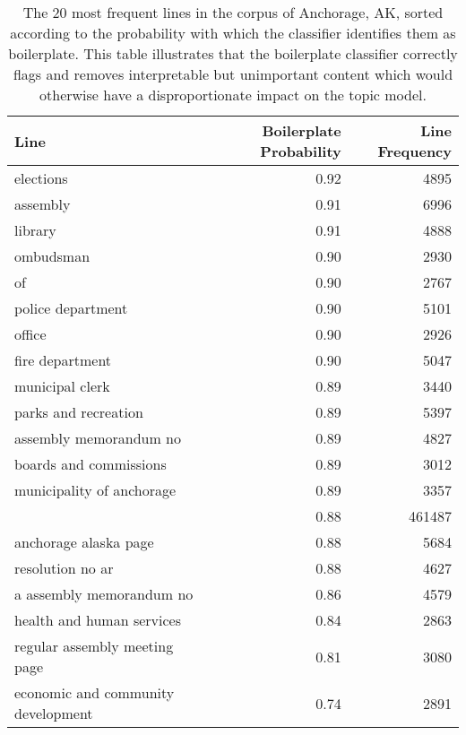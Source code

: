 \begin{table}[ht]
\centering
\begingroup\small
\begin{tabular}{lrr}
  \hline
Line & Boilerplate Probability & Line Frequency \\ 
  \hline
elections & 0.92 & 4895 \\ 
  assembly & 0.91 & 6996 \\ 
  library & 0.91 & 4888 \\ 
  ombudsman & 0.90 & 2930 \\ 
  of & 0.90 & 2767 \\ 
  police department & 0.90 & 5101 \\ 
  office & 0.90 & 2926 \\ 
  fire department & 0.90 & 5047 \\ 
  municipal clerk & 0.89 & 3440 \\ 
  parks and recreation & 0.89 & 5397 \\ 
  assembly memorandum no & 0.89 & 4827 \\ 
  boards and commissions & 0.89 & 3012 \\ 
  municipality of anchorage & 0.89 & 3357 \\ 
   & 0.88 & 461487 \\ 
  anchorage alaska page & 0.88 & 5684 \\ 
  resolution no ar & 0.88 & 4627 \\ 
  a assembly memorandum no & 0.86 & 4579 \\ 
  health and human services & 0.84 & 2863 \\ 
  regular assembly meeting page & 0.81 & 3080 \\ 
  economic and community development & 0.74 & 2891 \\ 
   \hline
\end{tabular}
\endgroup
\caption{The 20 most frequent lines in the corpus of Anchorage, AK, sorted according to the probability with which the classifier identifies them as boilerplate. This table illustrates that the boilerplate classifier correctly flags and removes interpretable but unimportant content which would otherwise have a disproportionate impact on the topic model.} 
\label{tabBoilerplateIllustration}
\end{table}

